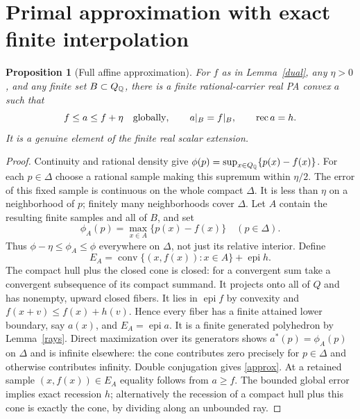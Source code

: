 \documentclass[11pt]{article}
\newtheorem{proposition}[theorem]{Proposition}
\theoremstyle{definition}\newtheorem{definition}[theorem]{Definition}
\theoremstyle{remark}\newtheorem{remark}[theorem]{Remark}
\newcommand{\epi}{\operatorname{epi}}\newcommand{\conv}{\operatorname{conv}}
\newcommand{\rec}{\operatorname{rec}}\newcommand{\dom}{\operatorname{dom}}
\begin{document}
\section{Primal approximation with exact finite interpolation}
\begin{proposition}[Full affine approximation]\label{affine}
For $f$ as in Lemma~\ref{dual}, any $\eta>0$, and any finite set $B\subset Q_\mathbb Q$, there is a finite rational-carrier real PA convex $a$ such that
\begin{equation}\label{approx}
f\leq a\leq f+\eta\quad\hbox{globally},\qquad a|_B=f|_B,\qquad \rec a=h.
\end{equation}
It is a genuine element of the finite real scalar extension.
\end{proposition}
\begin{proof}
Continuity and rational density give
$\phi(p)=\sup_{x\in Q_\mathbb Q}\{p(x)-f(x)\}$.
For each $p\in\Delta$ choose a rational sample making this supremum within $\eta/2$. The error of this fixed sample is continuous on the whole compact $\Delta$. It is less than $\eta$ on a neighborhood of $p$; finitely many neighborhoods cover $\Delta$. Let $A$ contain the resulting finite samples and all of $B$, and set
\[
\phi_A(p)=\max_{x\in A}\{p(x)-f(x)\}\quad(p\in\Delta).
\]
Thus $\phi-\eta\leq\phi_A\leq\phi$ everywhere on $\Delta$, not just its relative interior. Define
\begin{equation}\label{primalepi}
E_A=\conv\{(x,f(x)):x\in A\}+\epi h.
\end{equation}
The compact hull plus the closed cone is closed: for a convergent sum take a convergent subsequence of its compact summand. It projects onto all of $Q$ and has nonempty, upward closed fibers. It lies in $\epi f$ by convexity and $f(x+v)\leq f(x)+h(v)$. Hence every fiber has a finite attained lower boundary, say $a(x)$, and $E_A=\epi a$. It is a finite generated polyhedron by Lemma~\ref{rays}. Direct maximization over its generators shows
$a^*(p)=\phi_A(p)$ on $\Delta$ and is infinite elsewhere: the cone contributes zero precisely for $p\in\Delta$ and otherwise contributes infinity. Double conjugation gives \eqref{approx}. At a retained sample $(x,f(x))\in E_A$ equality follows from $a\geq f$. The bounded global error implies exact recession $h$; alternatively the recession of a compact hull plus this cone is exactly the cone, by dividing along an unbounded ray.


\end{proof}
\end{document}
